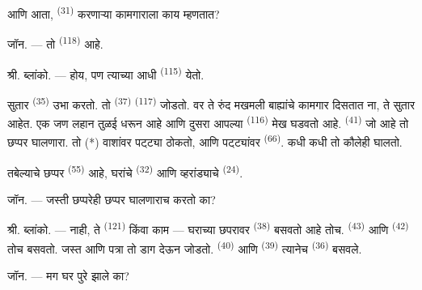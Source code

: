 आणि आता,  \textsuperscript{(31)} करणाऱ्या कामगाराला काय म्हणतात?

\textsc{जॉन}. --- तो  \textsuperscript{(118)} आहे.

\VUsaut{3.0mm}
\VUsaut{3.0mm}

श्री. \textsc{ब्लांको}. --- होय, पण त्याच्या आधी  \textsuperscript{(115)} येतो.

सुतार  \textsuperscript{(35)} उभा करतो. तो 
\textsuperscript{(37)}  \textsuperscript{(117)} जोडतो. वर ते रुंद मखमली
बाह्यांचे कामगार दिसतात ना, ते सुतार आहेत. एक जण लहान तुळई धरून आहे आणि दुसरा आपल्या
 \textsuperscript{(116)} मेख घडवतो आहे. 
\textsuperscript{(41)} जो आहे तो छप्पर घालणारा. तो (*) वाशांवर पट्ट्या ठोकतो, आणि पट्ट्यांवर
 \textsuperscript{(66)}. कधी कधी तो कौलेही घालतो.


तबेल्याचे छप्पर  \textsuperscript{(55)} आहे, घरांचे 
\textsuperscript{(32)} आणि व्हरांड्याचे  \textsuperscript{(24)}.

\textsc{जॉन}. --- जस्ती छप्परेही छप्पर घालणाराच करतो का?

श्री. \textsc{ब्लांको}. --- नाही, ते  \textsuperscript{(121)} किंवा
 काम — घराच्या छपरावर  \textsuperscript{(38)} बसवतो
आहे तोच.  \textsuperscript{(43)} आणि 
\textsuperscript{(42)} तोच बसवतो. जस्त आणि पत्रा तो डाग देऊन जोडतो. 
\textsuperscript{(40)} आणि  \textsuperscript{(39)} त्यानेच
 \textsuperscript{(36)} बसवले.

\textsc{जॉन}. --- मग घर पुरे झाले का?

\VUsaut{3.0mm}
\VUsaut{3.0mm}

